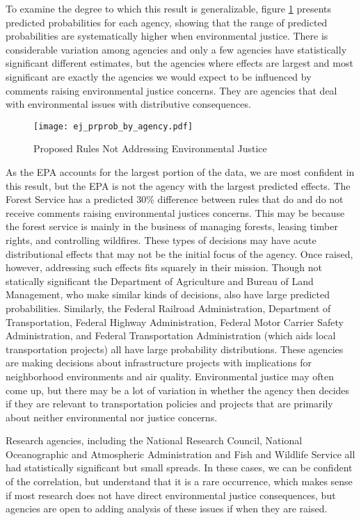 To examine the degree to which this result is generalizable, figure \ref{ejlogitagencies} presents predicted probabilities for each agency, showing that the range of predicted probabilities are systematically higher when environmental justice. There is considerable variation among agencies and only a few agencies have statistically significant different estimates, but the agencies where effects are largest and most significant are exactly the agencies we would expect to be influenced by comments raising environmental justice concerns. They are agencies that deal with environmental issues with distributive consequences. 


\begin{figure}[h!]
\caption{Proposed Rules Not Addressing Environmental Justice}
\texttt{[image: ej\_prprob\_by\_agency.pdf]}
\label{ejlogitagencies}

\end{figure}

As the EPA accounts for the largest portion of the data, we are most confident in this result, but the EPA is not the agency with the largest predicted effects. The Forest Service has a predicted 30\% difference between rules that do and do not receive comments raising environmental justices concerns. This may be because the forest service is mainly in the business of managing forests, leasing timber rights, and controlling wildfires. These types of decisions may have acute distributional effects that may not be the initial focus of the agency. Once raised, however, addressing such effects fits squarely in their mission. Though not statically significant the Department of Agriculture and Bureau of Land Management, who make similar kinds of decisions, also have large predicted probabilities. Similarly, the Federal Railroad Administration, Department of Transportation, Federal Highway Administration, Federal Motor Carrier Safety Administration, and Federal Transportation Administration (which aids local transportation projects) all have large probability distributions. These agencies are making decisions about infrastructure projects with implications for neighborhood environments and air quality. Environmental justice may often come up, but there may be a lot of variation in whether the agency then decides if they are relevant to transportation policies and projects that are primarily about neither environmental nor justice concerns. 

Research agencies, including the National Research Council, National Oceanographic and Atmospheric Administration and Fish and Wildlife Service all had statistically significant but small spreads. In these cases, we can be confident of the correlation, but understand that it is a rare occurrence, which makes sense if most research does not have direct environmental justice consequences, but agencies are open to adding analysis of these issues if when they are raised. 

